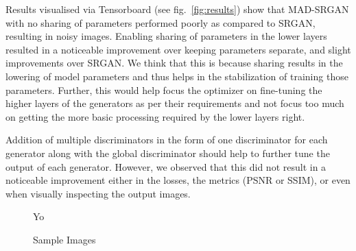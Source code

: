\documentclass[12pt,a4paper,twocolumn]{article}
\begin{document}
        Results visualised via Tensorboard \cite{tensorflow} (see fig.~\ref{fig:results}) show that MAD-SRGAN with no sharing of parameters performed poorly as compared to SRGAN, resulting in noisy images.
        Enabling sharing of parameters in the lower layers resulted in a noticeable improvement over keeping parameters separate, and slight improvements over SRGAN.
        We think that this is because sharing results in the lowering of model parameters and thus helps in the stabilization of training those parameters.
        Further, this would help focus the optimizer on fine-tuning the higher layers of the generators as per their requirements and not focus too much on getting the more basic processing required by the lower layers right.

        Addition of multiple discriminators in the form of one discriminator for each generator along with the global discriminator should help to further tune the output of each generator.
        However, we observed that this did not result in a noticeable improvement either in the losses, the metrics (PSNR or SSIM), or even when visually inspecting the output images.

        \begin{figure}
            \centering
            Yo
            \caption{Sample Images}
            \label{fig:samples}
        \end{figure}

    
    
\end{document}
